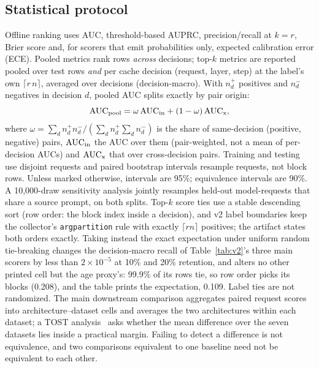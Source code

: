 \subsection{Statistical protocol}
Offline ranking uses AUC, threshold-based AUPRC, precision/recall at $k=r$, Brier
score and, for scorers that emit probabilities only, expected calibration error
(ECE). Pooled
metrics rank rows \emph{across} decisions; top-$k$ metrics are reported pooled over
test rows \emph{and} per cache decision (request, layer, step) at the label's own
$\lceil r\,n\rceil$, averaged over decisions (decision-macro). With $n_d^{+}$
positives and $n_d^{-}$ negatives in decision $d$, pooled AUC splits exactly by pair
origin:
\begin{equation}
\label{eq:split}
\mathrm{AUC}_{\rm pool}=\omega\,\mathrm{AUC}_{\rm in}+(1-\omega)\,\mathrm{AUC}_{\rm x},
\end{equation}
where $\omega=\sum_d n_d^{+}n_d^{-}/(\sum_d n_d^{+}\sum_d n_d^{-})$ is the share of
same-decision (positive, negative) pairs, $\mathrm{AUC}_{\rm in}$ the AUC over them
(pair-weighted, not a mean of per-decision AUCs) and $\mathrm{AUC}_{\rm x}$ that over
cross-decision pairs. Training and testing use disjoint requests and paired
bootstrap intervals resample requests, not block rows. Unless marked otherwise,
intervals are 95\%; equivalence intervals are 90\%. A 10,000-draw sensitivity analysis jointly resamples held-out model-requests that
share a source prompt, on both splits.
Top-$k$ score ties use a stable descending sort (row order: the block index inside a
decision), and v2 label boundaries keep the collector's \texttt{argpartition} rule with
exactly $\lceil rn\rceil$ positives; the artifact states both orders exactly. Taking
instead the exact expectation under uniform random tie-breaking changes the
decision-macro recall of Table~\ref{tab:v2}'s three main scorers by less than
$2\times10^{-5}$ at 10\% and 20\% retention, and alters no other printed cell but the
age proxy's: 99.9\% of its rows tie, so row order picks its blocks (0.208), and the
table prints the expectation, 0.109. Label ties are not randomized.
The main downstream comparison aggregates paired request scores into
architecture--dataset cells and averages the two architectures within each dataset;
a TOST analysis~\cite{schuirmann1987tost,lakens2017equivalence} asks whether the
mean difference over the seven datasets lies inside a practical margin. Failing to
detect a difference is not equivalence, and two comparisons equivalent to one
baseline need not be equivalent to each other.

